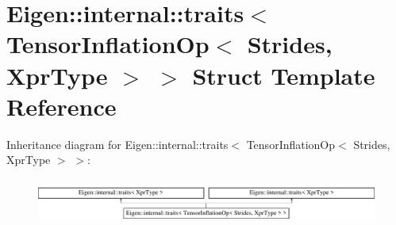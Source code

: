 \hypertarget{struct_eigen_1_1internal_1_1traits_3_01_tensor_inflation_op_3_01_strides_00_01_xpr_type_01_4_01_4}{}\section{Eigen\+:\+:internal\+:\+:traits$<$ Tensor\+Inflation\+Op$<$ Strides, Xpr\+Type $>$ $>$ Struct Template Reference}
\label{struct_eigen_1_1internal_1_1traits_3_01_tensor_inflation_op_3_01_strides_00_01_xpr_type_01_4_01_4}
Inheritance diagram for Eigen\+:\+:internal\+:\+:traits$<$ Tensor\+Inflation\+Op$<$ Strides, Xpr\+Type $>$ $>$\+:\begin{figure}[H]
\begin{center}
\leavevmode
\includegraphics[height=1.481482cm]{struct_eigen_1_1internal_1_1traits_3_01_tensor_inflation_op_3_01_strides_00_01_xpr_type_01_4_01_4}
\end{center}
\end{figure}
